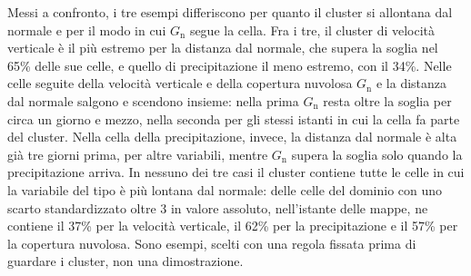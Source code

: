 \FloatBarrier  %
Messi a confronto, i tre esempi differiscono per quanto il cluster si allontana dal normale e per il modo in cui $G_{\mathrm{n}}$ segue la cella. Fra i tre, il cluster di velocità verticale è il più estremo per la distanza dal normale, che supera la soglia nel 65\% delle sue celle, e quello di precipitazione il meno estremo, con il 34\%. Nelle celle seguite della velocità verticale e della copertura nuvolosa $G_{\mathrm{n}}$ e la distanza dal normale salgono e scendono insieme: nella prima $G_{\mathrm{n}}$ resta oltre la soglia per circa un giorno e mezzo, nella seconda per gli stessi istanti in cui la cella fa parte del cluster. Nella cella della precipitazione, invece, la distanza dal normale è alta già tre giorni prima, per altre variabili, mentre $G_{\mathrm{n}}$ supera la soglia solo quando la precipitazione arriva. In nessuno dei tre casi il cluster contiene tutte le celle in cui la variabile del tipo è più lontana dal normale: delle celle del dominio con uno scarto standardizzato oltre 3 in valore assoluto, nell'istante delle mappe, ne contiene il 37\% per la velocità verticale, il 62\% per la precipitazione e il 57\% per la copertura nuvolosa. Sono esempi, scelti con una regola fissata prima di guardare i cluster, non una dimostrazione.

